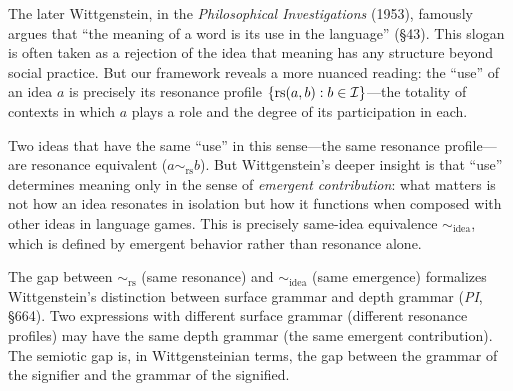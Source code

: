 \begin{interpretation}\label{interp:ch6:wittgenstein_pi}
The later Wittgenstein, in the \emph{Philosophical Investigations} (1953),
famously argues that ``the meaning of a word is its use in the language''
(\S{}43). This slogan is often taken as a rejection of the idea that
meaning has any structure beyond social practice. But our framework reveals
a more nuanced reading: the ``use'' of an idea $a$ is precisely its
resonance profile $\{\mathrm{rs}(a, b) : b \in \mathcal{I}\}$---the totality of contexts
in which $a$ plays a role and the degree of its participation in each.

Two ideas that have the same ``use'' in this sense---the same resonance
profile---are resonance equivalent ($a \sim_{\text{rs}} b$). But
Wittgenstein's deeper insight is that ``use'' determines meaning only in
the sense of \emph{emergent contribution}: what matters is not how an idea
resonates in isolation but how it functions when composed with other ideas
in language games. This is precisely same-idea equivalence
$\sim_{\text{idea}}$, which is defined by emergent behavior rather than
resonance alone.

The gap between $\sim_{\text{rs}}$ (same resonance) and
$\sim_{\text{idea}}$ (same emergence) formalizes Wittgenstein's distinction
between surface grammar and depth grammar (\emph{PI}, \S{}664). Two
expressions with different surface grammar (different resonance profiles)
may have the same depth grammar (the same emergent contribution). The
semiotic gap is, in Wittgensteinian terms, the gap between the grammar
of the signifier and the grammar of the signified.
\end{interpretation}

